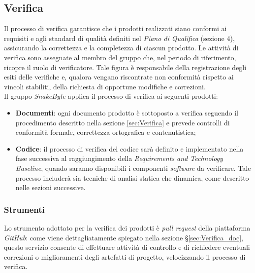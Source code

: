 \documentclass[10pt, letterpaper]{article}
\begin{document}
\subsection{Verifica}
Il processo di verifica garantisce che i prodotti realizzati siano conformi ai
requisiti e agli standard di qualità definiti nel \textit{Piano di Qualifica}
(sezione 4), assicurando la correttezza e la completezza di ciascun prodotto.
Le attività di verifica sono assegnate al membro del gruppo che, nel periodo di
riferimento, ricopre il ruolo di verificatore. Tale figura è responsabile della
registrazione degli esiti delle verifiche e, qualora vengano riscontrate non
conformità rispetto ai vincoli stabiliti, della richiesta di opportune modifiche
e correzioni.
\\Il gruppo \textit{SnakeByte} applica il processo di verifica ai seguenti prodotti:
\begin{itemize}
    \item \textbf{Documenti}: ogni documento prodotto è sottoposto a verifica
          seguendo il procedimento descritto nella sezione \ref{sec:Verifica} e
          prevede controlli di conformità formale, correttezza ortografica e contenutistica;
    \item \textbf{Codice}: il processo di verifica del codice sarà definito e
          implementato nella fase successiva al raggiungimento della
          \textit{Requirements and Technology Baseline}, quando saranno disponibili
          i componenti \textit{software} da verificare. Tale processo includerà sia tecniche
          di analisi statica che dinamica, come descritto nelle sezioni successive.
\end{itemize}

\subsubsection{Strumenti}
Lo strumento adottato per la verifica dei prodotti è \textit{pull request} della piattaforma \textit{GitHub}: come viene dettagliatamente spiegato nella sezione §\ref{sec:Verifica_doc}, questo servizio
consente di effettuare attività di controllo e di richiedere eventuali correzioni o miglioramenti degli artefatti di progetto, velocizzando il processo di verifica.
\end{document}
